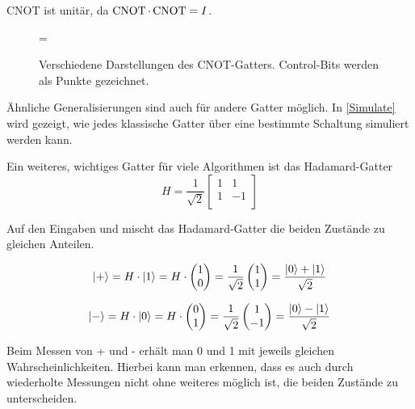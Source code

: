 \documentclass{acm_proc_article-sp}
\begin{document}
CNOT ist unitär, da $\operatorname{CNOT} \cdot \operatorname{CNOT} = I$.

\begin{figure}
  \centerline{
    \pictureCNOTa
    \hbox{=}
    \pictureCNOTb
  }
  \caption{
    Verschiedene Darstellungen des CNOT-Gatters. Control-Bits werden als Punkte gezeichnet.
  }
\end{figure}

Ähnliche Generalisierungen sind auch für andere Gatter möglich. In \ref{Simulate} wird gezeigt, wie jedes
klassische Gatter über eine bestimmte Schaltung simuliert werden kann.


Ein weiteres, wichtiges Gatter für viele Algorithmen ist das Hadamard-Gatter
\[
    H = \frac{1}{\sqrt 2}
    \begin{bmatrix}
        1 & 1 \\
        1 & -1 \\
    \end{bmatrix}
\]

\begin{center}
    \pictureHadamard
\end{center}

Auf den Eingaben  und  mischt das Hadamard-Gatter die beiden
Zustände zu gleichen Anteilen.

\[
    \left|+\right\rangle = H \cdot \left|1\right\rangle = H \cdot 
    \begin{pmatrix}
        1 \\ 0
    \end{pmatrix}
    = 
    \frac{1}{\sqrt 2}
    \begin{pmatrix}
        1 \\ 1
    \end{pmatrix}
    = 
    \frac{\left|0\right\rangle + \left|1\right\rangle}{\sqrt 2}
\]

\[
    \left|-\right\rangle = H \cdot \left|0\right\rangle = H \cdot 
    \begin{pmatrix}
        0 \\ 1
    \end{pmatrix}
    = 
    \frac{1}{\sqrt 2}
    \begin{pmatrix}
        1 \\ -1
    \end{pmatrix}
    = 
    \frac{\left|0\right\rangle - \left|1\right\rangle}{\sqrt 2}
\]

Beim Messen von \qreg + und \qreg -  erhält man 0 und 1 mit jeweils gleichen Wahrscheinlichkeiten.
Hierbei kann man erkennen, dass es auch durch wiederholte
Messungen nicht ohne weiteres möglich ist, die beiden Zustände zu unterscheiden.
\end{document}
